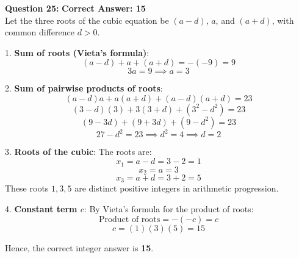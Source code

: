 \documentclass[11pt,a4paper]{article}
\begin{document}
\begin{tcolorbox}[solbox]
\textbf{\textcolor{primaryDark}{Question 25:}} \hfill \textbf{\textcolor{l1Green}{Correct Answer: 15}}\\
\vspace{4pt}
Let the three roots of the cubic equation be $(a - d)$, $a$, and $(a + d)$, with common difference $d > 0$.

1. \textbf{Sum of roots (Vieta's formula)}:
$$(a - d) + a + (a + d) = -(-9) = 9$$
$$3a = 9 \implies a = 3$$

2. \textbf{Sum of pairwise products of roots}:
$$(a - d)a + a(a + d) + (a - d)(a + d) = 23$$
$$(3 - d)(3) + 3(3 + d) + (3^2 - d^2) = 23$$
$$(9 - 3d) + (9 + 3d) + (9 - d^2) = 23$$
$$27 - d^2 = 23 \implies d^2 = 4 \implies d = 2$$

3. \textbf{Roots of the cubic}:
The roots are:
$$x_1 = a - d = 3 - 2 = 1$$
$$x_2 = a = 3$$
$$x_3 = a + d = 3 + 2 = 5$$
These roots $1, 3, 5$ are distinct positive integers in arithmetic progression.

4. \textbf{Constant term $c$}:
By Vieta's formula for the product of roots:
$$\text{Product of roots} = -(-c) = c$$
$$c = (1)(3)(5) = 15$$

Hence, the correct integer answer is \textbf{15}.
\end{tcolorbox}
\end{document}
